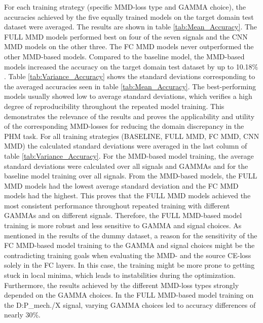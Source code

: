 For each training strategy (specific MMD-loss type and GAMMA choice), the accuracies achieved by the five equally trained models on the target domain test dataset were averaged. The results are shown in table \ref{tab:Mean_Accuracy}. The FULL MMD models performed best on four of the seven signals and the CNN MMD models on the other three. The FC MMD models never outperformed the other MMD-based models. Compared to the baseline model, the MMD-based models increased the accuracy on the target domain test dataset by up to 10.18$\%$. Table \ref{tab:Variance_Accuracy} shows the standard deviations corresponding to the averaged accuracies seen in table \ref{tab:Mean_Accuracy}. The best-performing models usually showed low to average standard deviations, which verifies a high degree of reproducibility throughout the repeated model training. This demonstrates the relevance of the results and proves the applicability and utility of the corresponding MMD-losses for reducing the domain discrepancy in the PHM task. For all training strategies (BASELINE, FULL MMD, FC MMD, CNN MMD) the calculated standard deviations were averaged in the last column of table \ref{tab:Variance_Accuracy}. For the MMD-based model training, the average standard deviations were calculated over all signals and GAMMAs and for the baseline model training over all signals. From the MMD-based models, the FULL MMD models had the lowest average standard deviation and the FC MMD models had the highest. This proves that the FULL MMD models achieved the most consistent performance throughout repeated training with different GAMMAs and on different signals. Therefore, the FULL MMD-based model training is more robust and less sensitive to GAMMA and signal choices. As mentioned in the results of the dummy dataset, a reason for the sensitivity of the FC MMD-based model training to the GAMMA and signal choices might be the contradicting training goals when evaluating the MMD- and the source CE-loss solely in the FC layers. In this case, the training might be more prone to getting stuck in local minima, which leads to instabilities during the optimization. Furthermore, the results achieved by the different MMD-loss types strongly depended on the GAMMA choices. In the FULL MMD-based model training on the D:P\_mech./X signal, varying GAMMA choices led to accuracy differences of nearly 30\%.

